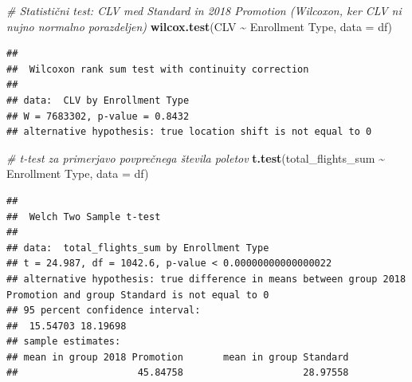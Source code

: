 \documentclass[
]{article}
\newenvironment{Shaded}{\begin{snugshade}}{\end{snugshade}}
\newcommand{\AttributeTok}[1]{\textcolor[rgb]{0.13,0.29,0.53}{#1}}
\newcommand{\CommentTok}[1]{\textcolor[rgb]{0.56,0.35,0.01}{\textit{#1}}}
\newcommand{\FunctionTok}[1]{\textcolor[rgb]{0.13,0.29,0.53}{\textbf{#1}}}
\newcommand{\NormalTok}[1]{#1}
\newcommand{\SpecialCharTok}[1]{\textcolor[rgb]{0.81,0.36,0.00}{\textbf{#1}}}
\newcommand{\StringTok}[1]{\textcolor[rgb]{0.31,0.60,0.02}{#1}}
\begin{document}
\begin{Shaded}
\begin{Highlighting}[]
\CommentTok{\# Statistični test: CLV med Standard in 2018 Promotion (Wilcoxon, ker CLV ni nujno normalno porazdeljen)}
\FunctionTok{wilcox.test}\NormalTok{(CLV }\SpecialCharTok{\textasciitilde{}} \StringTok{\textasciigrave{}}\AttributeTok{Enrollment Type}\StringTok{\textasciigrave{}}\NormalTok{, }\AttributeTok{data =}\NormalTok{ df)}
\end{Highlighting}
\end{Shaded}

\begin{verbatim}
## 
##  Wilcoxon rank sum test with continuity correction
## 
## data:  CLV by Enrollment Type
## W = 7683302, p-value = 0.8432
## alternative hypothesis: true location shift is not equal to 0
\end{verbatim}

\begin{Shaded}
\begin{Highlighting}[]
\CommentTok{\# t{-}test za primerjavo povprečnega števila poletov}
\FunctionTok{t.test}\NormalTok{(total\_flights\_sum }\SpecialCharTok{\textasciitilde{}} \StringTok{\textasciigrave{}}\AttributeTok{Enrollment Type}\StringTok{\textasciigrave{}}\NormalTok{, }\AttributeTok{data =}\NormalTok{ df)}
\end{Highlighting}
\end{Shaded}

\begin{verbatim}
## 
##  Welch Two Sample t-test
## 
## data:  total_flights_sum by Enrollment Type
## t = 24.987, df = 1042.6, p-value < 0.00000000000000022
## alternative hypothesis: true difference in means between group 2018 Promotion and group Standard is not equal to 0
## 95 percent confidence interval:
##  15.54703 18.19698
## sample estimates:
## mean in group 2018 Promotion       mean in group Standard 
##                     45.84758                     28.97558
\end{verbatim}

\begin{Shaded}
\end{Shaded}
\end{document}
